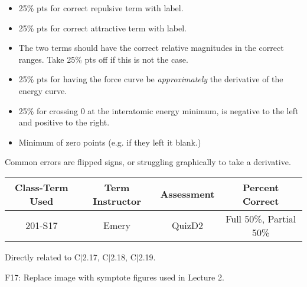 \begin{rubric}

\begin{itemize}
	\item 25\% pts for correct repulsive term with label.
	\item 25\% pts for correct attractive term with label. 
	\item The two terms should have the correct relative magnitudes in the correct ranges. Take 25\% pts off if this is not the case.
	\item 25\% pts for having the force curve be \emph{approximately} the derivative of the energy curve. 
	\item 25\% for crossing 0 at the interatomic energy minimum, is negative to the left and positive to the right.
	\item Minimum of zero points (e.g. if they left it blank.)
\end{itemize}

\end{rubric}

\begin{outcomes}
Common errors are flipped signs, or struggling graphically to take a derivative.
	\begin{center}
		\begin{tabular}{cccc}
			\hline\hline
			Class-Term Used & Term Instructor & Assessment & Percent Correct\\
			\hline
			201-S17 & Emery & QuizD2 & Full 50\%, Partial 50\%\\    %
			\hline
		\end{tabular}
	\end{center}
\end{outcomes}

\begin{comments}

Directly related to C$|$2.17, C$|$2.18, C$|$2.19.

F17: Replace image with symptote figures used in Lecture 2.

\end{comments}
